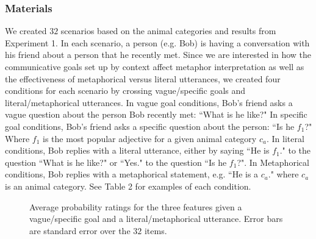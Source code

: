 \documentclass[10pt,letterpaper]{article}
\begin{document}
\subsubsection{Materials}
We created $32$ scenarios based on the animal categories and results from Experiment 1. In each scenario, a person (e.g. Bob) is having a conversation with his friend about a person that he recently met. Since we are interested in how the communicative goals set up by context affect metaphor interpretation as well as the effectiveness of metaphorical versus literal utterances, we created four conditions for each scenario by crossing vague/specific goals and literal/metaphorical utterances. In vague goal conditions, Bob's friend asks a vague question about the person Bob recently met: ``What is he like?" In specific goal conditions, Bob's friend asks a specific question about the person: ``Is he $f_1$?" Where $f_1$ is the most popular adjective for a given animal category $c_a$. In literal conditions, Bob replies with a literal utterance, either by saying ``He is $f_1$." to the question ``What is he like?" or ``Yes." to the question ``Is he $f_1$?". In Metaphorical conditions, Bob replies with a metaphorical statement, e.g. ``He is a $c_a$." where $c_a$ is an animal category. See Table 2 for examples of each condition.

\begin{figure}[t]
\begin{center}
\end{center}
\caption{Average probability ratings for the three features given a vague/specific goal and a literal/metaphorical utterance. Error bars are standard error over the $32$ items.} 
\label{human_bar}
\end{figure}
\end{document}
